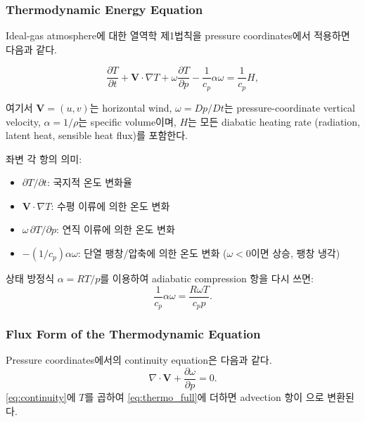 \subsubsection{Thermodynamic Energy Equation}

Ideal-gas atmosphere에 대한 열역학 제1법칙을 pressure coordinates에서 적용하면
다음과 같다.

\begin{equation}\label{eq:thermo_full}
  \frac{\partial T}{\partial t}
    + \mathbf{V}\cdot\nabla T
    + \omega\frac{\partial T}{\partial p}
    - \frac{1}{c_p}\alpha\omega
  = \frac{1}{c_p}H,
\end{equation}

\noindent
여기서 $\mathbf{V} = (u,v)$는 horizontal wind, $\omega = Dp/Dt$는
pressure-coordinate vertical velocity, $\alpha = 1/\rho$는
specific volume이며, $H$는 모든 diabatic heating rate
(radiation, latent heat, sensible heat flux)를 포함한다.

\begin{hisublock}
좌변 각 항의 의미:
\begin{itemize}
  \item $\partial T/\partial t$: 국지적 온도 변화율
  \item $\mathbf{V}\cdot\nabla T$: 수평 이류에 의한 온도 변화
  \item $\omega\,\partial T/\partial p$: 연직 이류에 의한 온도 변화
  \item $-(1/c_p)\alpha\omega$: 단열 팽창/압축에 의한 온도 변화 ($\omega<0$이면 상승, 팽창 냉각)
\end{itemize}
\end{hisublock}

\noindent
상태 방정식 $\alpha = RT/p$를 이용하여 adiabatic compression 항을 다시 쓰면:
\[
  \frac{1}{c_p}\alpha\omega = \frac{R\omega T}{c_p p}.
\]

\subsubsection{Flux Form of the Thermodynamic Equation}

Pressure coordinates에서의 continuity equation은 다음과 같다.
\begin{equation}\label{eq:continuity}
  \nabla\cdot\mathbf{V} + \frac{\partial\omega}{\partial p} = 0.
\end{equation}
\eqref{eq:continuity}에 $T$를 곱하여 \eqref{eq:thermo_full}에 더하면
advection 항이 으로 변환된다.

